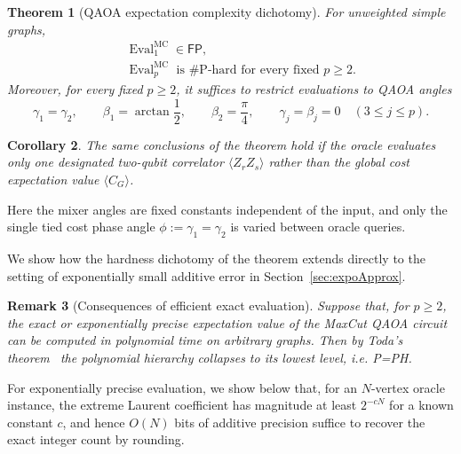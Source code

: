 \documentclass[11pt]{article}
\newtheorem{theorem}{Theorem}[section]
\newtheorem{corollary}[theorem]{Corollary}
\newtheorem{remark}[theorem]{Remark}
\newcommand{\Eval}{\operatorname{Eval}}
\newcommand{\FP}{\mathsf{FP}}
\newcommand{\sh}[1]{{#1}}
\begin{document}
\begin{theorem}%
[QAOA expectation complexity dichotomy]\label{thm:main}
For unweighted simple graphs,
\begin{eqnarray}
 &&\Eval^{\mathrm{MC}}_1\in\FP,\\
 &&\Eval^{\mathrm{MC}}_p\text{ is }\#\text{P-hard for every fixed }p\geq2.
 \label{eq:threshold}
\end{eqnarray}
Moreover, for every fixed $p\geq2$,
it suffices to restrict evaluations to QAOA angles
\begin{equation}
 \gamma_1=\gamma_2, %
 \qquad
 \beta_1=\arctan \frac12,
 \qquad 
 \beta_2=\frac{\pi}{4},
 \qquad
 \gamma_j=\beta_j=0\quad(3\leq j\leq p).
 \label{eq:base-restrictions}
\end{equation}
\end{theorem}
\begin{corollary}
    The same conclusions of the theorem hold if the oracle %
evaluates only one designated two-qubit correlator
$\langle Z_rZ_s\rangle$ rather than the global cost expectation value $\langle C_G \rangle $.
\end{corollary}



Here the mixer angles are fixed constants independent of the input, and 
only the single tied cost phase angle 
$\phi:=\gamma_1=\gamma_2$ 
is varied between oracle queries. 



We show how the hardness dichotomy of the theorem extends directly to the setting of exponentially small additive error in Section~\ref{sec:expoApprox}.












\begin{remark}[Consequences of efficient exact evaluation] 
 Suppose that, for %
 $p\ge 2$, the exact \sh{or exponentially precise} expectation value of
the MaxCut QAOA circuit can be computed in %
polynomial
time on arbitrary graphs. %
Then by Toda's theorem~\cite{Toda1991} the polynomial hierarchy collapses to its lowest level, i.e. P=PH.
\end{remark}



For exponentially precise evaluation, we show below that, for
an $N$-vertex oracle instance, the extreme Laurent coefficient
has magnitude at least %
$2^{-cN}$ for a known constant $c$, and hence $O(N)$ bits of
additive precision suffice to recover the exact integer count
by rounding.
\end{document}

